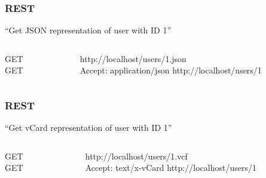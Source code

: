\begin{frame}
  \frametitle{REST}
  \begin{center}
  ``Get JSON representation of user with ID 1''
  \end{center}
  \begin{columns}
    \begin{column}{.2\textwidth}
      \begin{flushright}
      GET\\
      GET
      \end{flushright}
    \end{column}    
    \begin{column}{.8\textwidth}
      \begin{flushleft}
      http://localhost/users/1\alert{.json}\\
      \alert{Accept: application/json} http://localhost/users/1
      \end{flushleft}
    \end{column}    
  \end{columns}
\end{frame}

\begin{frame}
  \frametitle{REST}
  \begin{center}
  ``Get vCard representation of user with ID 1''
  \end{center}
  \begin{columns}
    \begin{column}{.2\textwidth}
      \begin{flushright}
      GET\\
      GET
      \end{flushright}
    \end{column}    
    \begin{column}{.8\textwidth}
      \begin{flushleft}
      http://localhost/users/1\alert{.vcf}\\
      \alert{Accept: text/x-vCard} http://localhost/users/1
      \end{flushleft}
    \end{column}    
  \end{columns}
\end{frame}

